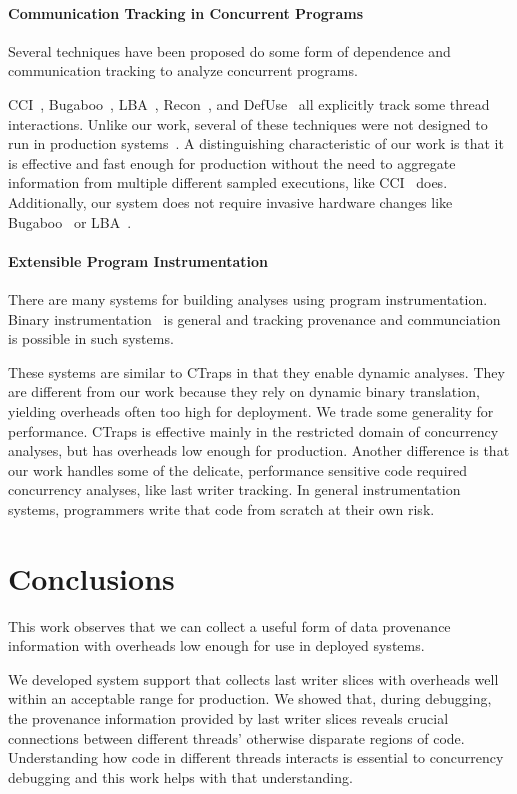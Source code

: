 \documentclass[preprint,9pt]{sigplanconf}
\newcommand{\ctraps}{CTraps\xspace}
\begin{document}
\paragraph{Communication Tracking in Concurrent Programs}
Several techniques have been proposed do some form of dependence and
communication tracking to analyze concurrent programs.  

CCI~\cite{cci}, Bugaboo~\cite{bugaboo}, LBA~\cite{paralog}, Recon~\cite{recon},
and DefUse~\cite{defuse} all explicitly track some thread interactions.  Unlike
our work, several of these techniques were not designed to run in production
systems~\cite{recon,defuse}.  A distinguishing characteristic of our work is
that it is effective and fast enough for production without the need to
aggregate information from multiple different sampled executions, like
CCI~\cite{cci} does.  Additionally, our system does not require invasive
hardware changes like Bugaboo~\cite{bugaboo} or LBA~\cite{paralog}.

\paragraph{Extensible Program Instrumentation} 
There are many systems for building analyses using program instrumentation.
Binary instrumentation~\cite{pin,dynamorio,valgrind,roadrunner} is general and
tracking provenance and communciation is possible in such systems.  

These systems are similar to \ctraps in that they enable dynamic analyses.
They are different from our work because they rely on dynamic binary
translation, yielding overheads often too high for deployment.  We trade some
generality for performance. \ctraps is effective mainly in the restricted
domain of concurrency analyses, but has overheads low enough for production.
Another difference is that our work handles some of the delicate, performance
sensitive code required concurrency analyses, like last writer tracking.  In
general instrumentation systems, programmers write that code from scratch at
their own risk.  

\section{Conclusions}
This work observes that we can collect a useful form of data provenance
information with overheads low enough for use in deployed systems. 

We developed system support that collects last writer slices with overheads
well within an acceptable range for production.  We showed that, during
debugging, the provenance information provided by last writer slices reveals
crucial connections between different threads' otherwise disparate regions of
code.  Understanding how code in different threads interacts is essential to
concurrency debugging and this work helps with that understanding.
\end{document}
